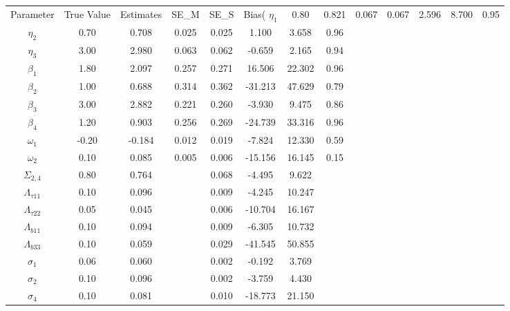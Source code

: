 \begin{table}[ht]
\centering
\begin{tabular}{cccccccc}
  \hline
Parameter & True Value & Estimates & SE_M & SE_S & Bias(%
  \hline
\hline
$\eta_1$ & 0.80 & 0.821 & 0.067 & 0.067 & 2.596 & 8.700 & 0.95 \\ 
  $\eta_2$ & 0.70 & 0.708 & 0.025 & 0.025 & 1.100 & 3.658 & 0.96 \\ 
  $\eta_3$ & 3.00 & 2.980 & 0.063 & 0.062 & -0.659 & 2.165 & 0.94 \\ 
  $\beta_1$ & 1.80 & 2.097 & 0.257 & 0.271 & 16.506 & 22.302 & 0.96 \\ 
  $\beta_2$ & 1.00 & 0.688 & 0.314 & 0.362 & -31.213 & 47.629 & 0.79 \\ 
  $\beta_3$ & 3.00 & 2.882 & 0.221 & 0.260 & -3.930 & 9.475 & 0.86 \\ 
  $\beta_4$ & 1.20 & 0.903 & 0.256 & 0.269 & -24.739 & 33.316 & 0.96 \\ 
  $\omega_1$ & -0.20 & -0.184 & 0.012 & 0.019 & -7.824 & 12.330 & 0.59 \\ 
  $\omega_2$ & 0.10 & 0.085 & 0.005 & 0.006 & -15.156 & 16.145 & 0.15 \\ 
   \hline
$\Sigma_{2,4}$ & 0.80 & 0.764 &  & 0.068 & -4.495 & 9.622 &  \\ 
  $\Lambda_{\tau11}$ & 0.10 & 0.096 &  & 0.009 & -4.245 & 10.247 &  \\ 
  $\Lambda_{\tau22}$ & 0.05 & 0.045 &  & 0.006 & -10.704 & 16.167 &  \\ 
  $\Lambda_{b11}$ & 0.10 & 0.094 &  & 0.009 & -6.305 & 10.732 &  \\ 
  $\Lambda_{b33}$ & 0.10 & 0.059 &  & 0.029 & -41.545 & 50.855 &  \\ 
  $\sigma_1$ & 0.06 & 0.060 &  & 0.002 & -0.192 & 3.769 &  \\ 
  $\sigma_2$ & 0.10 & 0.096 &  & 0.002 & -3.759 & 4.430 &  \\ 
  $\sigma_4$ & 0.10 & 0.081 &  & 0.010 & -18.773 & 21.150 &  \\ 
  \end{tabular}
\end{table}
